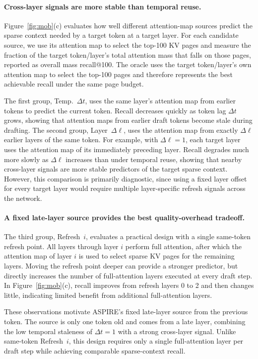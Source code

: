 \paragraph{Cross-layer signals are more stable than temporal reuse.}
\label{section:mob3}
Figure~\ref{fig:mob}(c) evaluates how well different attention-map sources predict the sparse context needed by a target token at a target layer. For each candidate source, we use its attention map to select the top-100 KV pages and measure the fraction of the target token/layer's total attention mass that falls on those pages, reported as overall mass recall@100. The oracle uses the target token/layer's own attention map to select the top-100 pages and therefore represents the best achievable recall under the same page budget.

The first group, Temp.~$\Delta t$, uses the same layer's attention map from earlier tokens to predict the current token. Recall decreases quickly as token lag $\Delta t$ grows, showing that attention maps from earlier draft tokens become stale during drafting. The second group, Layer~$\Delta \ell$, uses the attention map from exactly $\Delta \ell$ earlier layers of the same token. For example, with $\Delta \ell$$=$$1$, each target layer uses the attention map of its immediately preceding layer. Recall degrades much more slowly as $\Delta \ell$ increases than under temporal reuse, showing that nearby cross-layer signals are more stable predictors of the target sparse context. However, this comparison is primarily diagnostic, since using a fixed layer offset for every target layer would require multiple layer-specific refresh signals across the network.

\paragraph{A fixed late-layer source provides the best quality-overhead tradeoff.}
\label{section:mob4}
The third group, Refresh~$i$, evaluates a practical design with a single same-token refresh point. All layers through layer $i$ perform full attention, after which the attention map of layer $i$ is used to select sparse KV pages for the remaining layers. Moving the refresh point deeper can provide a stronger predictor, but directly increases the number of full-attention layers executed at every draft step. In Figure~\ref{fig:mob}(c), recall improves from refresh layers 0 to 2 and then changes little, indicating limited benefit from additional full-attention layers.

These observations motivate ASPIRE's fixed late-layer source from the previous token. The source is only one token old and comes from a late layer, combining the low temporal staleness of $\Delta t$$=$$1$ with a strong cross-layer signal. Unlike same-token Refresh~$i$, this design requires only a single full-attention layer per draft step while achieving comparable sparse-context recall.
